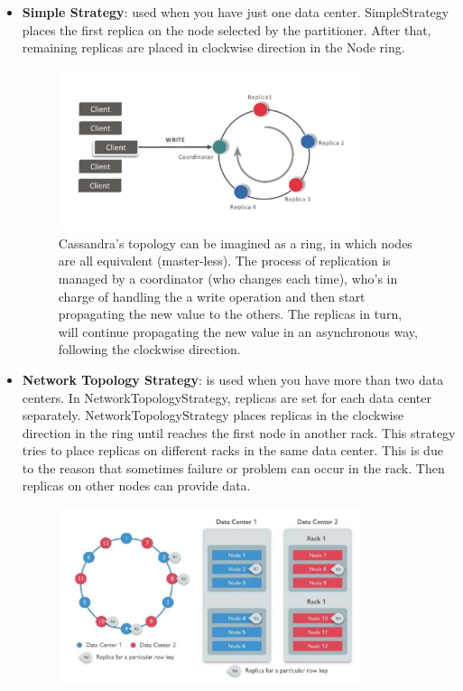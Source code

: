 \documentclass[10pt,a4paper]{article}
\begin{document}
\begin{itemize}
	\item \textbf{Simple Strategy}: used when you have just one data center. SimpleStrategy places the first replica on the node selected by the partitioner. After that, remaining replicas are placed in clockwise direction in the Node ring. 
	\begin{figure}[h!]
 \hfill \includegraphics[width=250pt]{images/cassandra-simple-strategy.png}\hspace*{\fill}
 \caption{Cassandra's topology can be imagined as a ring, in which nodes are all equivalent (master-less). The process of replication is managed by a coordinator (who changes each time), who's in charge of handling the a write operation and then start propagating the new value to the others. The replicas in turn, will continue propagating the new value in an asynchronous way, following the clockwise direction.}
\end{figure}
	\item \textbf{Network Topology Strategy}: is used when you have more than two data centers. In NetworkTopologyStrategy, replicas are set for each data center separately. NetworkTopologyStrategy places replicas in the clockwise direction in the ring until reaches the first node in another rack. This strategy tries to place replicas on different racks in the same data center. This is due to the reason that sometimes failure or problem can occur in the rack. Then replicas on other nodes can provide data.

\begin{figure}[h!]
 \hfill \includegraphics[width=250pt]{images/network-topology-strategy.png}\hspace*{\fill}
\end{figure}
\end{itemize}
\end{document}
